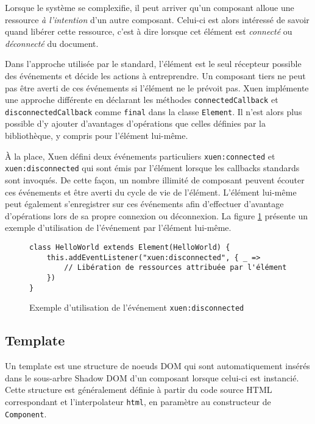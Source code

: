 Lorsque le système se complexifie, il peut arriver qu'un composant alloue une ressource \emph{à l'intention} d'un autre composant. Celui-ci est alors intéressé de savoir quand libérer cette ressource, c'est à dire lorsque cet élément est \emph{connecté} ou \emph{déconnecté} du document.

Dans l'approche utilisée par le standard, l'élément est le seul récepteur possible des événements et décide les actions à entreprendre. Un composant tiers ne peut pas être averti de ces événements si l'élément ne le prévoit pas. Xuen implémente une approche différente en déclarant les méthodes \texttt{connectedCallback} et \texttt{disconnectedCallback} comme \texttt{final} dans la classe \texttt{Element}. Il n'est alors plus possible d'y ajouter d'avantages d'opérations que celles définies par la bibliothèque, y compris pour l'élément lui-même.

À la place, Xuen défini deux événements particuliers \texttt{xuen:connected} et \texttt{xuen:disconnected} qui sont émis par l'élément lorsque les callbacks standards sont invoqués. De cette façon, un nombre illimité de composant peuvent écouter ces événements et être averti du cycle de vie de l'élément. L'élément lui-même peut également s'enregistrer sur ces événements afin d'effectuer d'avantage d'opérations lors de sa propre connexion ou déconnexion. La figure \ref{fig:web-spec-event-disconnected} présente un exemple d'utilisation de l'événement par l'élément lui-même.

\begin{figure}[h]
	\begin{lstlisting}
class HelloWorld extends Element(HelloWorld) {
	this.addEventListener("xuen:disconnected", { _ =>
		// Libération de ressources attribuée par l'élément
	})
}
	\end{lstlisting}
	\caption{Exemple d'utilisation de l'événement \texttt{xuen:disconnected}}
	\label{fig:web-spec-event-disconnected}
\end{figure}

\subsection{Template} \label{sec:web-specs-template}

Un template est une structure de noeuds DOM qui sont automatiquement insérés dans le sous-arbre Shadow DOM d'un composant lorsque celui-ci est instancié. Cette structure est généralement définie à partir du code source HTML correspondant et l'interpolateur \texttt{html}, en paramètre au constructeur de \texttt{Component}.

